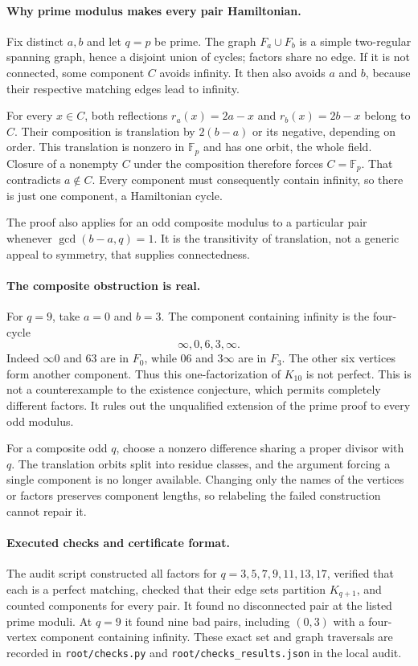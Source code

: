 \documentclass[11pt,a4paper]{article}
\begin{document}
\paragraph{Why prime modulus makes every pair Hamiltonian.}
Fix distinct $a,b$ and let $q=p$ be prime. The graph $F_a\cup F_b$ is a simple two-regular spanning graph, hence a disjoint union of cycles; factors share no edge. If it is not connected, some component $C$ avoids infinity. It then also avoids $a$ and $b$, because their respective matching edges lead to infinity.

For every $x\in C$, both reflections $r_a(x)=2a-x$ and $r_b(x)=2b-x$ belong to $C$. Their composition is translation by $2(b-a)$ or its negative, depending on order. This translation is nonzero in $\mathbb F_p$ and has one orbit, the whole field. Closure of a nonempty $C$ under the composition therefore forces $C=\mathbb F_p$. That contradicts $a\notin C$. Every component must consequently contain infinity, so there is just one component, a Hamiltonian cycle.

The proof also applies for an odd composite modulus to a particular pair whenever $\gcd(b-a,q)=1$. It is the transitivity of translation, not a generic appeal to symmetry, that supplies connectedness.

\paragraph{The composite obstruction is real.}
For $q=9$, take $a=0$ and $b=3$. The component containing infinity is the four-cycle
\[
\infty,0,6,3,\infty.
\]
Indeed $\infty0$ and $63$ are in $F_0$, while $06$ and $3\infty$ are in $F_3$. The other six vertices form another component. Thus this one-factorization of $K_{10}$ is not perfect. This is not a counterexample to the existence conjecture, which permits completely different factors. It rules out the unqualified extension of the prime proof to every odd modulus.

For a composite odd $q$, choose a nonzero difference sharing a proper divisor with $q$. The translation orbits split into residue classes, and the argument forcing a single component is no longer available. Changing only the names of the vertices or factors preserves component lengths, so relabeling the failed construction cannot repair it.

\paragraph{Executed checks and certificate format.}
The audit script constructed all factors for $q=3,5,7,9,11,13,17$, verified that each is a perfect matching, checked that their edge sets partition $K_{q+1}$, and counted components for every pair. It found no disconnected pair at the listed prime moduli. At $q=9$ it found nine bad pairs, including $(0,3)$ with a four-vertex component containing infinity. These exact set and graph traversals are recorded in \texttt{root/checks.py} and \texttt{root/checks\_results.json} in the local audit.
\end{document}
